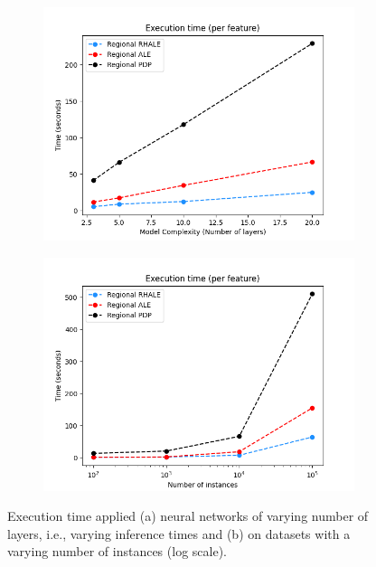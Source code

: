 \documentclass[
twocolumn,
]{ceurart}
\begin{document}
\begin{figure}
  \centering
  \begin{subfigure}[t]{0.24\textwidth}
  \centering
  \includegraphics[width=\linewidth]{figures/simulation_2/efficiency_layers.png}
  \caption{}
  \label{fig:efficiency_heavy_model}
  \end{subfigure}
  \begin{subfigure}[t]{0.24\textwidth}
  \centering
  \includegraphics[width=\linewidth]{figures/simulation_2/efficiency_samples.png}
  \caption{}
  \label{fig:efficiency_nof_instances}
  \end{subfigure}
  \caption{Execution time applied (a) neural networks of varying number of layers, i.e., varying inference times and (b) on datasets with a varying number of instances (log scale).}
\end{figure}
\end{document}
